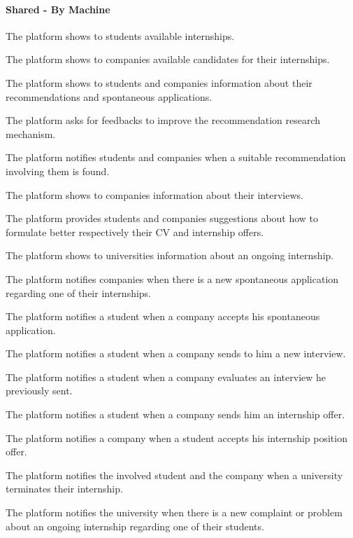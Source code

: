 \paragraph{Shared - By Machine}
\begin{enumerate}[label={\color{titleColor}[SPM\arabic*]}]
    \item The platform shows to students available internships.
\item The platform shows to companies available candidates for their internships.
\item The platform shows to students and companies information about their recommendations and spontaneous applications.
\item The platform asks for feedbacks to improve the recommendation research mechanism.
\item The platform notifies students and companies when a suitable recommendation involving them is found.
\item The platform shows to companies information about their interviews.
\item The platform provides students and companies suggestions about how to formulate better respectively their CV and internship offers.
\item The platform shows to universities information about an ongoing internship.
\item The platform notifies companies when there is a new spontaneous application regarding one of their internships.
\item The platform notifies a student when a company accepts his spontaneous application.
\item The platform notifies a student when a company sends to him a new interview.
\item The platform notifies a student when a company evaluates an interview he previously sent.
\item The platform notifies a student when a company sends him an internship offer.
\item The platform notifies a company when a student accepts his internship position offer.
\item The platform notifies the involved student and the company when a university terminates their internship.
\item The platform notifies the university when there is a new complaint or problem about an ongoing internship regarding one of their students.

\end{enumerate}
